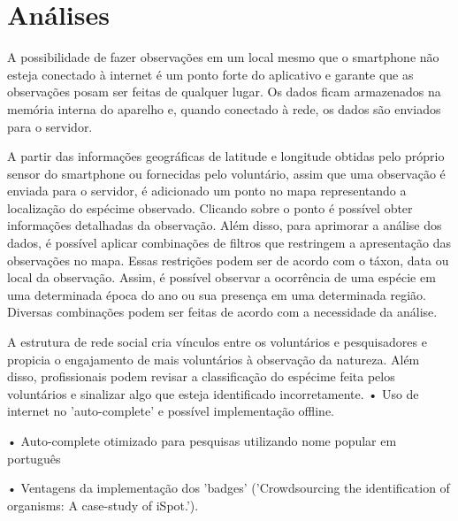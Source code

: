 \section{Análises}
A possibilidade de fazer observações em um local mesmo que o smartphone não esteja conectado à internet é um ponto forte do aplicativo e garante que as observações posam ser feitas de qualquer lugar. Os dados ficam armazenados na memória interna do aparelho e, quando conectado à rede, os dados são enviados para o servidor.

A partir das informações geográficas de latitude e longitude obtidas pelo próprio sensor do smartphone ou fornecidas pelo voluntário, assim que uma observação é enviada para o servidor, é adicionado um ponto no mapa representando a localização do espécime observado. Clicando sobre o ponto é possível obter informações detalhadas da observação. Além disso, para aprimorar a análise dos dados, é possível aplicar combinações de filtros que restringem a apresentação das observações no mapa. Essas restrições podem ser de acordo com o táxon, data ou local da observação. Assim, é possível observar a ocorrência de uma espécie em uma determinada época do ano ou sua presença em uma determinada região. Diversas combinações podem ser feitas de acordo com a necessidade da análise.

A estrutura de rede social cria vínculos entre os voluntários e pesquisadores e propicia o engajamento de mais voluntários à observação da natureza. Além disso, profissionais podem revisar a classificação do espécime feita pelos voluntários e sinalizar algo que esteja identificado incorretamente.
• Uso de internet no 'auto-complete' e possível implementação offline.

• Auto-complete otimizado para pesquisas utilizando nome popular em português

• Ventagens da implementação dos 'badges' ('Crowdsourcing the identification of organisms: A case-study of iSpot.').